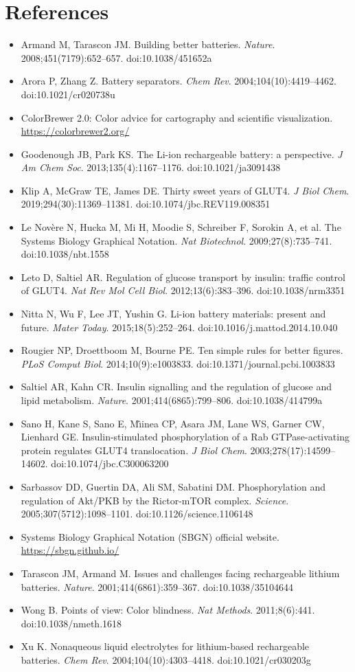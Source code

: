 \section*{References}

\begin{itemize}
\item Armand M, Tarascon JM. Building better batteries. \emph{Nature}. 2008;451(7179):652--657. doi:10.1038/451652a
\item Arora P, Zhang Z. Battery separators. \emph{Chem Rev}. 2004;104(10):4419--4462. doi:10.1021/cr020738u
\item ColorBrewer 2.0: Color advice for cartography and scientific visualization. \url{https://colorbrewer2.org/}
\item Goodenough JB, Park KS. The Li-ion rechargeable battery: a perspective. \emph{J Am Chem Soc}. 2013;135(4):1167--1176. doi:10.1021/ja3091438
\item Klip A, McGraw TE, James DE. Thirty sweet years of GLUT4. \emph{J Biol Chem}. 2019;294(30):11369--11381. doi:10.1074/jbc.REV119.008351
\item Le Nov\`ere N, Hucka M, Mi H, Moodie S, Schreiber F, Sorokin A, et al. The Systems Biology Graphical Notation. \emph{Nat Biotechnol}. 2009;27(8):735--741. doi:10.1038/nbt.1558
\item Leto D, Saltiel AR. Regulation of glucose transport by insulin: traffic control of GLUT4. \emph{Nat Rev Mol Cell Biol}. 2012;13(6):383--396. doi:10.1038/nrm3351
\item Nitta N, Wu F, Lee JT, Yushin G. Li-ion battery materials: present and future. \emph{Mater Today}. 2015;18(5):252--264. doi:10.1016/j.mattod.2014.10.040
\item Rougier NP, Droettboom M, Bourne PE. Ten simple rules for better figures. \emph{PLoS Comput Biol}. 2014;10(9):e1003833. doi:10.1371/journal.pcbi.1003833
\item Saltiel AR, Kahn CR. Insulin signalling and the regulation of glucose and lipid metabolism. \emph{Nature}. 2001;414(6865):799--806. doi:10.1038/414799a
\item Sano H, Kane S, Sano E, M\^{\i}inea CP, Asara JM, Lane WS, Garner CW, Lienhard GE. Insulin-stimulated phosphorylation of a Rab GTPase-activating protein regulates GLUT4 translocation. \emph{J Biol Chem}. 2003;278(17):14599--14602. doi:10.1074/jbc.C300063200
\item Sarbassov DD, Guertin DA, Ali SM, Sabatini DM. Phosphorylation and regulation of Akt/PKB by the Rictor-mTOR complex. \emph{Science}. 2005;307(5712):1098--1101. doi:10.1126/science.1106148
\item Systems Biology Graphical Notation (SBGN) official website. \url{https://sbgn.github.io/}
\item Tarascon JM, Armand M. Issues and challenges facing rechargeable lithium batteries. \emph{Nature}. 2001;414(6861):359--367. doi:10.1038/35104644
\item Wong B. Points of view: Color blindness. \emph{Nat Methods}. 2011;8(6):441. doi:10.1038/nmeth.1618
\item Xu K. Nonaqueous liquid electrolytes for lithium-based rechargeable batteries. \emph{Chem Rev}. 2004;104(10):4303--4418. doi:10.1021/cr030203g
\end{itemize}
